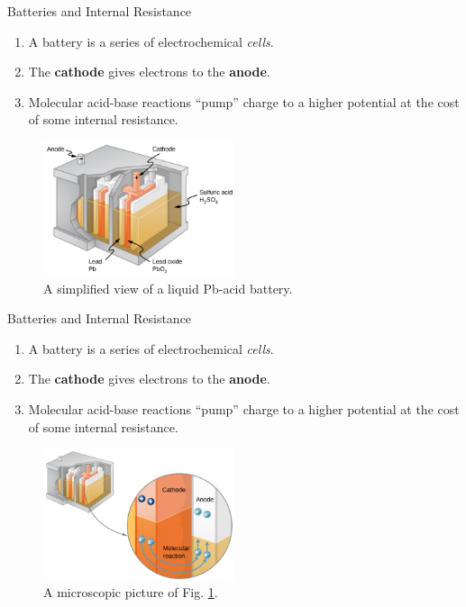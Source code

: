 \documentclass{beamer}
\begin{document}
\begin{frame}{Batteries and Internal Resistance}
\small
\begin{enumerate}
\item A battery is a series of electrochemical \textit{cells}.
\item The \textbf{cathode} gives electrons to the \textbf{anode}.
\item Molecular acid-base reactions ``pump'' charge to a higher potential at the cost of some internal resistance.
\end{enumerate}
\begin{figure}
\centering
\includegraphics[width=0.5\textwidth]{figures/batt.png}
\caption{\label{fig:batt} A simplified view of a liquid Pb-acid battery.}
\end{figure}
\end{frame}

\begin{frame}{Batteries and Internal Resistance}
\small
\begin{enumerate}
\item A battery is a series of electrochemical \textit{cells}.
\item The \textbf{cathode} gives electrons to the \textbf{anode}.
\item Molecular acid-base reactions ``pump'' charge to a higher potential at the cost of some internal resistance.
\end{enumerate}
\begin{figure}
\centering
\includegraphics[width=0.5\textwidth]{figures/batt2.png}
\caption{\label{fig:batt2} A microscopic picture of Fig. \ref{fig:batt}.}
\end{figure}
\end{frame}
\end{document}
